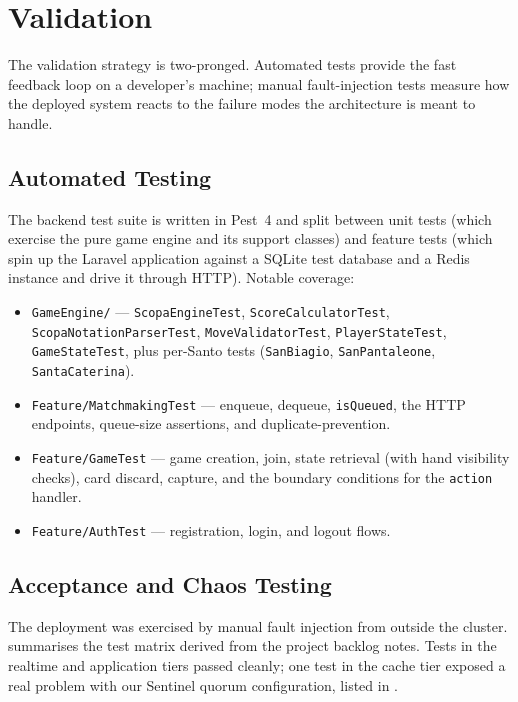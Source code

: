 \documentclass{scrartcl}
\begin{document}
\section{Validation}\label{validation}

The validation strategy is two-pronged. Automated tests provide the
fast feedback loop on a developer's machine; manual fault-injection
tests measure how the deployed system reacts to the failure modes the
architecture is meant to handle.

\subsection{Automated Testing}

The backend test suite is written in Pest~4 and split between unit
tests (which exercise the pure game engine and its support classes)
and feature tests (which spin up the Laravel application against a
SQLite test database and a Redis instance and drive it through HTTP).
Notable coverage:

\begin{itemize}[leftmargin=1.4em]
  \item \texttt{GameEngine/} --- \texttt{ScopaEngineTest},
  \texttt{ScoreCalculatorTest},
  \texttt{ScopaNotationParserTest},
  \texttt{MoveValidatorTest},
  \texttt{PlayerStateTest}, \texttt{GameStateTest},
  plus per-Santo tests (\texttt{SanBiagio}, \texttt{SanPantaleone},
  \texttt{SantaCaterina}).
  \item \texttt{Feature/MatchmakingTest} --- enqueue, dequeue,
  \texttt{isQueued}, the HTTP endpoints, queue-size assertions, and
  duplicate-prevention.
  \item \texttt{Feature/GameTest} --- game creation, join,
  state retrieval (with hand visibility checks),
  card discard, capture, and the boundary conditions for the
  \texttt{action} handler.
  \item \texttt{Feature/AuthTest} --- registration, login, and
  logout flows.
\end{itemize}


\subsection{Acceptance and Chaos Testing}

The deployment was exercised by manual fault injection from outside
the cluster.  summarises the test matrix derived from
the project backlog notes. Tests in the realtime and application
tiers passed cleanly; one test in the cache tier exposed a real
problem with our Sentinel quorum configuration, listed in
.
\end{document}
